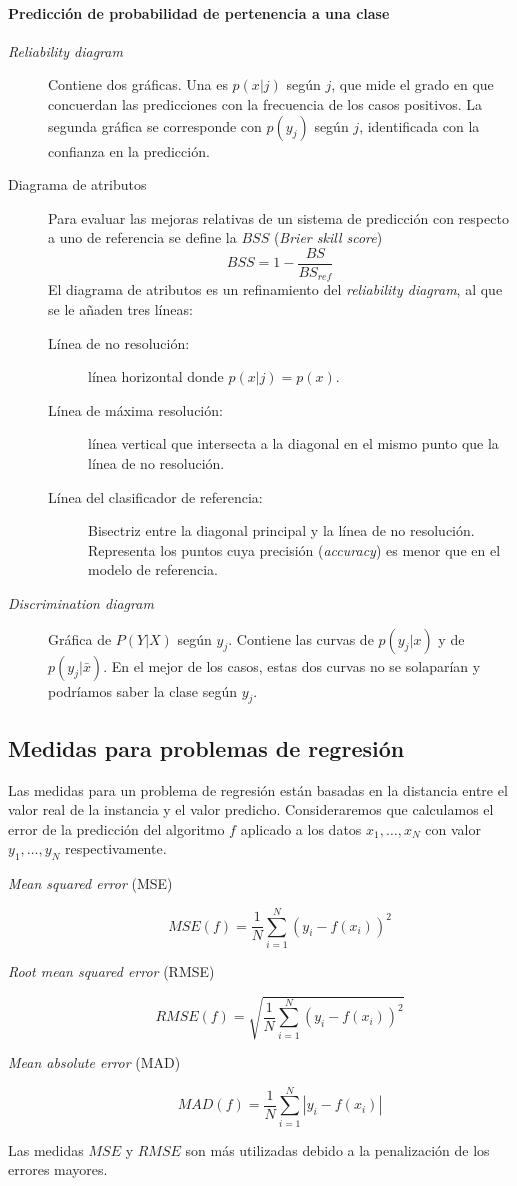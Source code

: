 \paragraph{Predicción de probabilidad de pertenencia a una clase} 	
	\begin{description}
		\item[\textit{Reliability diagram}] Contiene dos gráficas. Una es $p(x|j)$ según $j$, que mide el grado en que concuerdan las predicciones con la frecuencia de los casos positivos. La segunda gráfica se corresponde con $p(y_j)$ según $j$, identificada con la confianza en la predicción.
		\item[Diagrama de atributos] Para evaluar las mejoras relativas de un sistema de predicción con respecto a uno de referencia se define la $BSS$ (\textit{Brier skill score})
			\[BSS = 1 - \frac{BS}{BS_{ref}} \]
			El diagrama de atributos es un refinamiento del \textit{reliability diagram}, al que se le añaden tres líneas: 
			\begin{description}
			\item[Línea de no resolución:] línea horizontal donde $p(x|j)=p(x)$.
			\item[Línea de máxima resolución:] línea vertical que intersecta a la diagonal en el mismo punto que la línea de no resolución.
			\item[Línea del clasificador de referencia:] Bisectriz entre la diagonal principal y la línea de no resolución. Representa los puntos cuya precisión (\textit{accuracy}) es menor que en el modelo de referencia.
			\end{description}
		\item[\textit{Discrimination diagram}] Gráfica de $P(Y|X)$ según $y_j$. Contiene las curvas de $p(y_j|x)$ y de $p(y_j|\bar{x})$. En el mejor de los casos, estas dos curvas no se solaparían y podríamos saber la clase según $y_j$.
	\end{description}
	
	
\subsection*{Medidas para problemas de regresión}

	Las medidas para un problema de regresión están basadas en la distancia entre el valor real de la instancia y el valor predicho. Consideraremos que calculamos el error de la predicción del algoritmo $f$ aplicado a los datos $x_1, \dots, x_N$ con valor $y_1, \dots, y_N$ respectivamente.
	
\begin{description}
	\item[\textit{Mean squared error} (MSE)]
		\[ MSE(f) = \frac{1}{N} \sum\limits_{i=1}^N
								(y_i - f(x_i))^2	\]
	\item[\textit{Root mean squared error} (RMSE)] 
		\[ RMSE(f) = \sqrt{\frac{1}{N} \sum\limits_{i=1}^N
								(y_i - f(x_i))^2}	\]
	\item[\textit{Mean absolute error} (MAD) ]
		\[ MAD(f) = \frac{1}{N} \sum\limits_{i=1}^N
								|y_i - f(x_i)|	\]
\end{description}

	Las medidas $MSE$ y $RMSE$ son más utilizadas debido a la penalización de los errores mayores. 
	
%